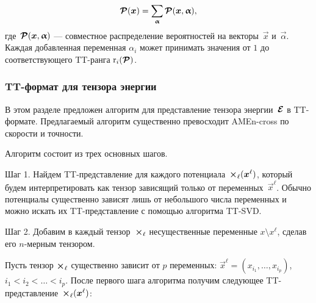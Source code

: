 \begin{equation}
\boldsymbol{\mathcal{P}}(\boldsymbol{x}) = \sum_{\boldsymbol{\upalpha}} \boldsymbol{\mathcal{P}}(\boldsymbol{x}, \boldsymbol{\upalpha}),
\end{equation}
где~$\boldsymbol{\mathcal{P}}(\boldsymbol{x}, \boldsymbol{\upalpha})$ --- совместное распределение вероятностей на векторы~$\vec{x}$ и~$\vec{\alpha}$.
Каждая добавленная переменная $\alpha_i$ может принимать значения от $1$ до соответствующего TT\hyp{}ранга $\operatorname{r}_i(\boldsymbol{\mathcal{P}})$.


\subsubsection{TT\hyp{}формат для тензора энергии}
\label{sec:energy-representation}

В этом разделе предложен алгоритм для представление тензора энергии~$\boldsymbol{\mathcal{E}}$ в TT\hyp{}формате. Предлагаемый алгоритм существенно превосходит AMEn-cross по скорости и точности.

Алгоритм состоит из трех основных шагов.

Шаг 1. Найдем TT\hyp{}представление для каждого потенциала~$\boldsymbol{\mathcal{\Theta}}_\ell(\boldsymbol{x}^\ell)$, который будем интерпретировать как тензор зависящий только от переменных~$\vec{x}^\ell$. Обычно потенциалы существенно зависят лишь от небольшого числа переменных и можно искать их TT\hyp{}представление с помощью алгоритма TT-SVD.

Шаг 2. Добавим в каждый тензор~$\boldsymbol{\mathcal{\Theta}}_\ell$ несущественные переменные $x \setminus x^\ell$, сделав его $n$-мерным тензором.

Пусть тензор $\boldsymbol{\mathcal{\Theta}}_\ell$ существенно зависит от $p$ переменных: $\vec{x}^\ell = (x_{i_1}, \ldots, x_{i_p})$, $i_1 < i_2 < \ldots < i_p$. После первого шага алгоритма получим следующее TT\hyp{}представление~$\boldsymbol{\mathcal{\Theta}}_\ell(\boldsymbol{x}^\ell)$:

